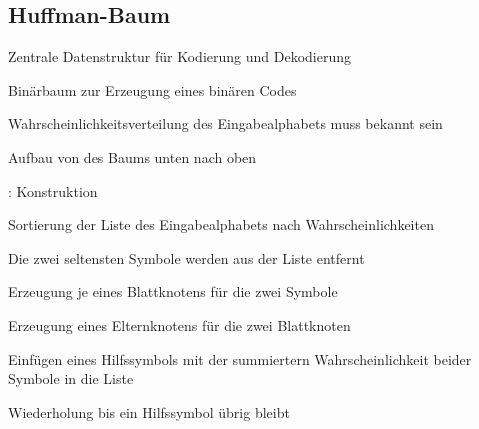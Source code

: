 \documentclass[xcolor=dvipsnames,presentation]{beamer}    %
\newenvironment{witemize}{\itemize\setlength{\itemsep}{1em}}{\enditemize}
\begin{document}
\subsection{Huffman-Baum}

\begin{frame}[<+->]{\insertsubsection}
  \begin{witemize}
  \item Zentrale Datenstruktur für Kodierung und Dekodierung
  \item Binärbaum zur Erzeugung eines binären Codes
  \item Wahrscheinlichkeitsverteilung des Eingabealphabets muss bekannt sein
  \item Aufbau von des Baums unten nach oben
  \end{witemize}
\end{frame}

\begin{frame}[<+->]{\insertsubsection: Konstruktion}
  \begin{witemize}
  \item Sortierung der Liste des Eingabealphabets nach Wahrscheinlichkeiten
  \item Die zwei seltensten Symbole werden aus der Liste entfernt
  \item Erzeugung je eines Blattknotens für die zwei Symbole
  \item Erzeugung eines Elternknotens für die zwei Blattknoten
  \item Einfügen eines Hilfssymbols mit der summiertern
    Wahrscheinlichkeit beider Symbole in die Liste
  \item Wiederholung bis ein Hilfssymbol übrig bleibt
  \end{witemize}
\end{frame}
\end{document}
